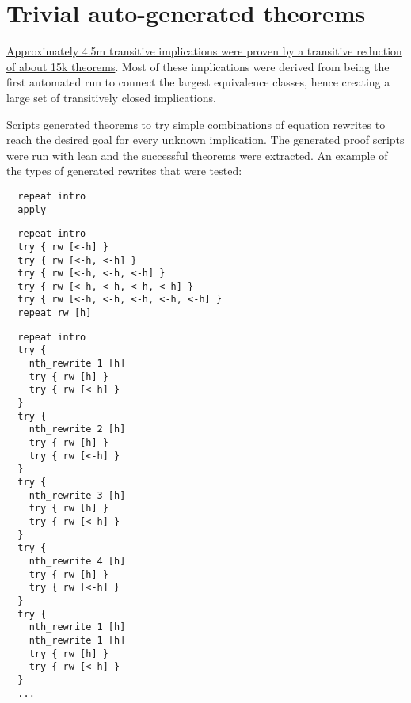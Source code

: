 \chapter{Trivial auto-generated theorems}\label{trivial-auto-chapter}

\href{https://github.com/teorth/equational_theories/tree/main/equational_theories/Generated/TrivialBruteforce}{Approximately 4.5m transitive implications were proven by a transitive reduction of about 15k theorems}. Most of these implications were derived from being the first automated run to connect the largest equivalence classes, hence creating a large set of transitively closed implications.

Scripts generated theorems to try simple combinations of equation rewrites to reach the desired goal for every unknown implication. The generated proof scripts were run with lean and the successful theorems were extracted. An example of the types of generated rewrites that were tested:

\begin{verbatim}
  repeat intro
  apply
\end{verbatim}

\begin{verbatim}
  repeat intro
  try { rw [<-h] }
  try { rw [<-h, <-h] }
  try { rw [<-h, <-h, <-h] }
  try { rw [<-h, <-h, <-h, <-h] }
  try { rw [<-h, <-h, <-h, <-h, <-h] }
  repeat rw [h]
\end{verbatim}

\begin{verbatim}
  repeat intro
  try {
    nth_rewrite 1 [h]
    try { rw [h] }
    try { rw [<-h] }
  }
  try {
    nth_rewrite 2 [h]
    try { rw [h] }
    try { rw [<-h] }
  }
  try {
    nth_rewrite 3 [h]
    try { rw [h] }
    try { rw [<-h] }
  }
  try {
    nth_rewrite 4 [h]
    try { rw [h] }
    try { rw [<-h] }
  }
  try {
    nth_rewrite 1 [h]
    nth_rewrite 1 [h]
    try { rw [h] }
    try { rw [<-h] }
  }
  ...
\end{verbatim}
